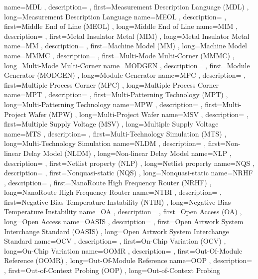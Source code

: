 { name={MDL}
, description={}
, first={Measurement Description Language (MDL)}
, long={Measurement Description Language}
}
{ name={MEOL}
, description={}
, first={Middle End of Line (MEOL)}
, long={Middle End of Line}
}
{ name={MIM}
, description={}
, first={Metal Insulator Metal (MIM)}
, long={Metal Insulator Metal}
}
{ name={MM}
, description={}
, first={Machine Model (MM)}
, long={Machine Model}
}
{ name={MMMC}
, description={}
, first={Multi-Mode Multi-Corner (MMMC)}
, long={Multi-Mode Multi-Corner}
}
{ name={MODGEN}
, description={}
, first={Module Generator (MODGEN)}
, long={Module Generator}
}
{ name={MPC}
, description={}
, first={Multiple Process Corner (MPC)}
, long={Multiple Process Corner}
}
{ name={MPT}
, description={}
, first={Multi-Patterning Technology (MPT)}
, long={Multi-Patterning Technology}
}
{ name={MPW}
, description={}
, first={Multi-Project Wafer (MPW)}
, long={Multi-Project Wafer}
}
{ name={MSV}
, description={}
, first={Multiple Supply Voltage (MSV)}
, long={Multiple Supply Voltage}
}
{ name={MTS}
, description={}
, first={Multi-Technology Simulation (MTS)}
, long={Multi-Technology Simulation}
}
{ name={NLDM}
, description={}
, first={Non-linear Delay Model (NLDM)}
, long={Non-linear Delay Model}
}
{ name={NLP}
, description={}
, first={Netlist property (NLP)}
, long={Netlist property}
}
{ name={NQS}
, description={}
, first={Nonquasi-static (NQS)}
, long={Nonquasi-static}
}
{ name={NRHF}
, description={}
, first={NanoRoute High Frequency Router (NRHF)}
, long={NanoRoute High Frequency Router}
}
{ name={NTBI}
, description={}
, first={Negative Bias Temperature Instability (NTBI)}
, long={Negative Bias Temperature Instability}
}
{ name={OA}
, description={}
, first={Open Access (OA)}
, long={Open Access}
}
{ name={OASIS}
, description={}
, first={Open Artwork System Interchange Standard (OASIS)}
, long={Open Artwork System Interchange Standard}
}
{ name={OCV}
, description={}
, first={On-Chip Variation (OCV)}
, long={On-Chip Variation}
}
{ name={OOMR}
, description={}
, first={Out-Of-Module Reference (OOMR)}
, long={Out-Of-Module Reference}
}
{ name={OOP}
, description={}
, first={Out-of-Context Probing (OOP)}
, long={Out-of-Context Probing}
}
